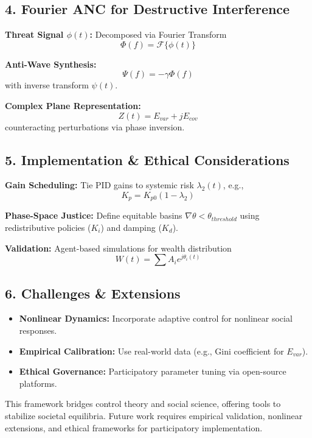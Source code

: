 \documentclass{article}
\theoremstyle{definition}
\begin{document}
\subsection*{4. Fourier ANC for Destructive Interference}
\textbf{Threat Signal \( \phi(t) \):} Decomposed via Fourier Transform  
\[
\Phi(f) = \mathcal{F} \{ \phi(t) \}
\]

\textbf{Anti-Wave Synthesis:}  
\[
\Psi(f) = -\gamma \Phi(f)
\]
with inverse transform \( \psi(t) \).

\textbf{Complex Plane Representation:}  
\[
Z(t) = E_{var} + j E_{cov}
\]
counteracting perturbations via phase inversion.

\subsection*{5. Implementation \& Ethical Considerations}
\textbf{Gain Scheduling:} Tie PID gains to systemic risk \( \lambda_2(t) \), e.g.,  
\[
K_p = K_{p0} (1 - \lambda_2)
\]

\textbf{Phase-Space Justice:} Define equitable basins \( \nabla \theta < \theta_{threshold} \) using redistributive policies (\( K_i \)) and damping (\( K_d \)).  

\textbf{Validation:} Agent-based simulations for wealth distribution  
\[
W(t) = \sum A_i e^{j \theta_i (t)}
\]

\subsection*{6. Challenges \& Extensions}
\begin{itemize}
    \item \textbf{Nonlinear Dynamics:} Incorporate adaptive control for nonlinear social responses.
    \item \textbf{Empirical Calibration:} Use real-world data (e.g., Gini coefficient for \( E_{var} \)).
    \item \textbf{Ethical Governance:} Participatory parameter tuning via open-source platforms.
\end{itemize}

This framework bridges control theory and social science, offering tools to stabilize societal equilibria. Future work requires empirical validation, nonlinear extensions, and ethical frameworks for participatory implementation.
\\
\\
\end{document}
